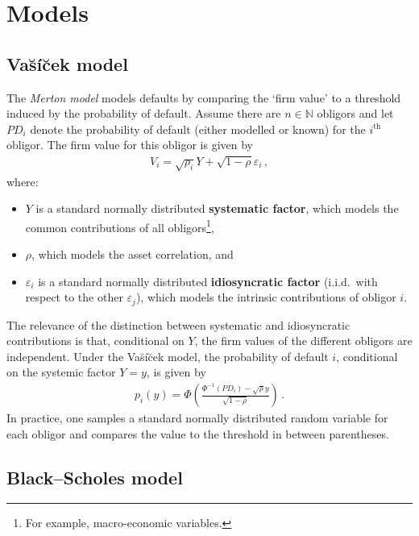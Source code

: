 \section{Models}
\subsection{Va\u{s}\'i\u{c}ek model}

    The \textit{Merton model} models defaults by comparing the `firm value' to a threshold induced by the probability of default. Assume there are $n\in\mathbb{N}$ obligors and let $PD_i$ denote the probability of default (either modelled or known) for the $i^{\text{th}}$ obligor. The firm value for this obligor is given by
    \begin{gather}
        V_i = \sqrt{\rho_i}Y + \sqrt{1-\rho}\varepsilon_i\,,
    \end{gather}
    where:
    \begin{itemize}
        \item $Y$ is a standard normally distributed \textbf{systematic factor}, which models the common contributions of all obligors\footnote{For example, macro-economic variables.},
        \item $\rho$, which models the asset correlation, and
        \item $\varepsilon_i$ is a standard normally distributed \textbf{idiosyncratic factor} (i.i.d.~with respect to the other $\varepsilon_j$), which models the intrinsic contributions of obligor $i$.
    \end{itemize}
    The relevance of the distinction between systematic and idiosyncratic contributions is that, conditional on $Y$, the firm values of the different obligors are independent. Under the Va\u{s}\'i\u{c}ek model, the probability of default $i$, conditional on the systemic factor $Y=y$, is given by
    \begin{gather}
        p_i(y) = \Phi\left(\frac{\Phi^{-1}(PD_i)-\sqrt{\rho}y}{\sqrt{1-\rho}}\right)\,.
    \end{gather}
    In practice, one samples a standard normally distributed random variable for each obligor and compares the value to the threshold in between parentheses.

\subsection{Black--Scholes model}

